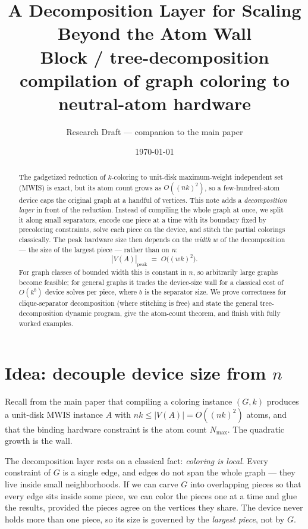 \documentclass[11pt]{article}
\title{\textbf{A Decomposition Layer for Scaling Beyond the Atom Wall}\\[0.4em]
\large Block / tree-decomposition compilation of graph coloring to neutral-atom hardware}
\author{Research Draft --- companion to the main paper}
\date{\today}
\theoremstyle{definition}
\theoremstyle{remark}
\begin{document}
\maketitle

\begin{abstract}
The gadgetized reduction of $k$-coloring to unit-disk maximum-weight independent
set (MWIS) is exact, but its atom count grows as $O((nk)^2)$, so a few-hundred-atom
device caps the original graph at a handful of vertices. This note adds a
\emph{decomposition layer} in front of the reduction. Instead of compiling the
whole graph at once, we split it along small separators, encode one piece at a
time with its boundary fixed by precoloring constraints, solve each piece on the
device, and stitch the partial colorings classically. The peak hardware size then
depends on the \emph{width} $w$ of the decomposition --- the size of the largest
piece --- rather than on $n$:
\[
   |V(A)|_{\mathrm{peak}} \;=\; O\big((wk)^2\big).
\]
For graph classes of bounded width this is constant in $n$, so arbitrarily large
graphs become feasible; for general graphs it trades the device-size wall for a
classical cost of $O(k^{b})$ device solves per piece, where $b$ is the separator
size. We prove correctness for clique-separator decomposition (where stitching is
free) and state the general tree-decomposition dynamic program, give the atom-count
theorem, and finish with fully worked examples.
\end{abstract}

\tableofcontents

\section{Idea: decouple device size from $n$}

Recall from the main paper that compiling a coloring instance $(G,k)$ produces a
unit-disk MWIS instance $A$ with $nk \le |V(A)| = O((nk)^2)$ atoms, and that the
binding hardware constraint is the atom count $N_{\max}$. The quadratic growth is
the wall.

The decomposition layer rests on a classical fact: \emph{coloring is local}. Every
constraint of $G$ is a single edge, and edges do not span the whole graph --- they
live inside small neighborhoods. If we can carve $G$ into overlapping pieces so
that every edge sits inside some piece, we can color the pieces one at a time and
glue the results, provided the pieces agree on the vertices they share. The device
never holds more than one piece, so its size is governed by the \emph{largest
piece}, not by $G$.
\end{document}
